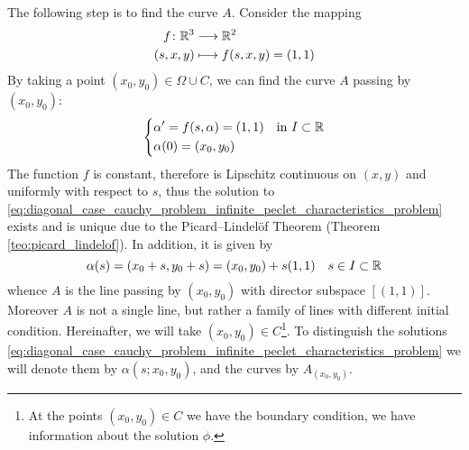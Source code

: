 The following step is to find the curve $A$. Consider the mapping 
\begin{equation*}
	\begin{aligned}
		f \colon \mathbb{R}^3 &\longrightarrow \mathbb{R}^2 \\
		(s,x,y) &\longmapsto f(s,x,y) = (1,1)
	\end{aligned}
\end{equation*}
By taking a point $(x_0, y_0) \in \Omega \cup C$, we can find the curve $A$
passing by $(x_0, y_0)$:
\begin{equation} \label{eq:diagonal_case_cauchy_problem_infinite_peclet_characteristics_problem}
	\left\{
		\begin{aligned}
			&\alpha' = f(s,\alpha) = (1,1) & &\text{in } I \subset \mathbb{R} \\
			&\alpha(0) = (x_0, y_0)
		\end{aligned}
	\right.
\end{equation}
The function $f$ is constant, therefore is Lipschitz continuous on $(x,y)$ and
uniformly with respect to $s$, thus the solution to
\eqref{eq:diagonal_case_cauchy_problem_infinite_peclet_characteristics_problem}
exists and is unique due to the Picard--Lindelöf Theorem (Theorem
\ref{teo:picard_lindelof}). In addition, it is given by
\begin{equation} \label{eq:diagonal_case_cauchy_problem_infinite_peclet_characteristics_solution}
	\alpha(s) = (x_0 + s, y_0 + s) = (x_0, y_0) + s(1, 1) \quad s \in I \subset \mathbb{R}
\end{equation}
whence $A$ is the line passing by $(x_0, y_0)$ with director subspace $[(1,
1)]$. Moreover $A$ is not a single line, but rather a family of lines with
different initial condition. Hereinafter, we will take $(x_0,y_0) \in
C$\footnote{At the points $(x_0,y_0) \in C$ we have the boundary condition, \ie
we have information about the solution $\phi$.}. To distinguish the solutions
\eqref{eq:diagonal_case_cauchy_problem_infinite_peclet_characteristics_problem}
we will denote them by $\alpha(s; x_0, y_0)$, and the curves by $A_{(x_0,y_0)}$.

